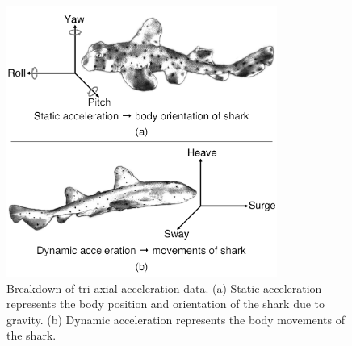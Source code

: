 \documentclass[conference]{IEEEtran}
\begin{document}
\begin{figure}[h]
	\centering
	\includegraphics[width=3.49in]{accel.pdf}
	\caption{Breakdown of tri-axial acceleration data. (a) Static acceleration represents the body position and orientation      of the shark due to gravity. (b) Dynamic acceleration represents the body movements of the shark.}
	\label{accel}
\end{figure} %
\end{document}
